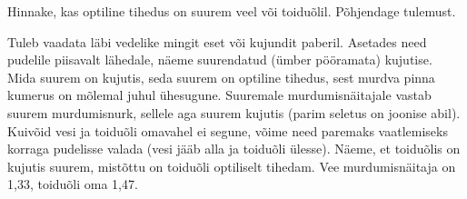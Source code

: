 
Hinnake, kas optiline tihedus on suurem veel või toiduõlil. Põhjendage tulemust.

\hint

\solu
Tuleb vaadata läbi vedelike mingit eset või kujundit paberil. Asetades need pudelile piisavalt lähedale, näeme suurendatud (ümber pööramata) kujutise. Mida suurem on kujutis, seda suurem on optiline tihedus, sest murdva pinna kumerus on mõlemal juhul ühesugune. Suuremale murdumisnäitajale vastab suurem murdumisnurk, sellele aga suurem kujutis (parim seletus on joonise abil). Kuivõid vesi ja toiduõli omavahel ei segune, võime need paremaks vaatlemiseks korraga pudelisse valada (vesi jääb alla ja toiduõli ülesse). Näeme, et toiduõlis on kujutis suurem, mistõttu on toiduõli optiliselt tihedam. Vee murdumisnäitaja on 1,33, toiduõli oma 1,47.
\probend
